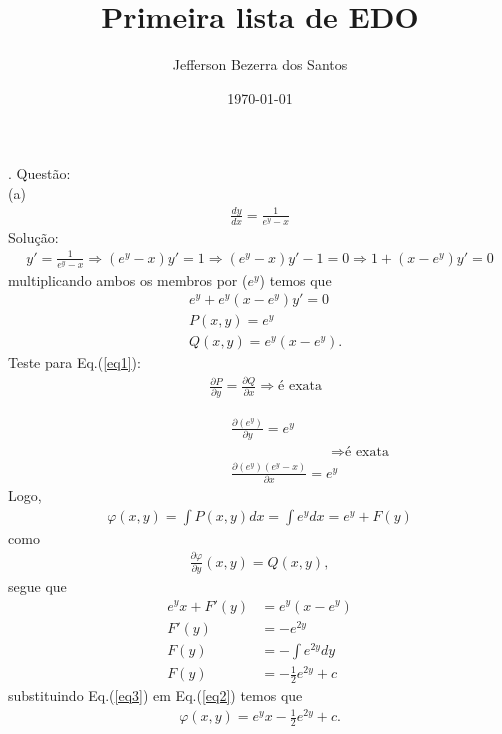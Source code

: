 \documentclass[a4paper,11pt]{article}
\date{\today}
\title{Primeira lista de EDO}
\author{Jefferson Bezerra dos Santos}
\newcommand {\fq}[2]{\frac{#1}{#2}}
\newcommand {\dvp}[2]{\frac{\partial#1}{\partial#2}}
\newcommand {\ex}[1]{e^{#1}}
\newcommand {\eq}[1]{Eq.(\ref{#1})}
\begin{document}
. Quest\~ao:\\
(a) \\
\begin{align*}
	\fq{dy}{dx} = \fq{1}{\ex{y}-x} 
\end{align*}
Solu\c c\~ao:
\begin{align*}
	y'= \fq{1}{\ex{y}-x} \Rightarrow (\ex{y}-x)y' = 1 \Rightarrow (\ex{y}-x)y' - 1 = 0 \Rightarrow 1 + (x-\ex{y})y'= 0
\end{align*}
multiplicando ambos os membros por ($\ex{y}$) temos que
\begin{align}
	\label{eq1}
&	 \ex{y} + \ex{y}(x-\ex{y})y'= 0 \\ \nonumber 
&	P(x,y) = \ex{y} \\  
&	Q(x,y) = \ex{y}(x-\ex{y}). \nonumber
\end{align}
Teste para \eq{eq1}:
\begin{align*}
&\dvp{P}{y} =  \dvp{Q}{x} \Rightarrow \text{\'e exata}  
\end{align*}

\begin{align*}
 \hspace{3cm}&\dvp{(\ex{y})}{y} = \ex{y} & \\
 \hspace{3cm}& \hspace{3cm} \Rightarrow \mbox{\'e exata}\\ 
 \hspace{3cm}&\dvp{(\ex{y})({\ex{y}-x})}{x}= \ex{y} & 
\end{align*}
Logo,
\begin{align}
	\label{eq2}
	\varphi (x,y) = \int P(x,y)dx = \int \ex{y}dx = \ex{y} + F(y)
\end{align}
como
\begin{align*}
	 \dvp{\varphi}{y}(x,y) = Q(x,y),
\end{align*}
segue que
\begin{align}
	\label{eq3}
	\ex{y}x + F'(y) &= \ex{y}(x - \ex{y}) \nonumber \\
	 F'(y)& = -\ex{2y}\nonumber \\ 
	 F(y)& = - \int \ex{2y}dy \nonumber \\
	 F(y)& = - \fq{1}{2} \ex{2y} + c
\end{align}
substituindo \eq{eq3} em \eq{eq2} temos que
\begin{align*}
	\varphi (x,y) = \ex{y}x - \fq{1}{2} \ex{2y} + c.
\end{align*}
\end{document}
